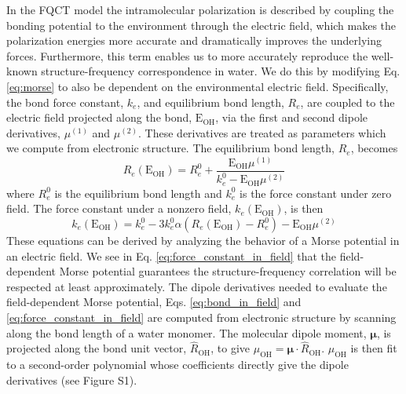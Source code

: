 \documentclass[journal=jctcce,manuscript=article]{achemso}
\begin{document}
In the FQCT model the intramolecular polarization is described by coupling the bonding potential to the environment through the electric field, which makes the polarization energies more accurate and dramatically improves the underlying forces. Furthermore, this term enables us to more accurately reproduce the well-known structure-frequency correspondence in water.\cite{boyer2019beyond} We do this by modifying Eq. \ref{eq:morse} to also be dependent on the environmental electric field.\cite{boyer2019beyond} Specifically, the bond force constant, $k_e$, and equilibrium bond length, $R_e$, are coupled to the electric field projected along the bond, $\mathrm{E_{OH}}$, via the first and second dipole derivatives, $\mu^{(1)}$ and $\mu^{(2)}$. These derivatives are treated as parameters which we compute from electronic structure. The equilibrium bond length, $R_e$, becomes
\begin{equation}
  R_e(\mathrm{E_{OH}})=R_e^0+ \frac{\mathrm{E_{OH}}\mu^{(1)}}{k_e^0-\mathrm{E_{OH}}\mu^{(2)}}
  \label{eq:bond_in_field}
\end{equation}
where $R_e^0$ is the equilibrium bond length and $k_e^0$ is the force constant under zero field. The force constant under a nonzero field, $k_e(\mathrm{E_{OH}})$, is then
\begin{equation}
  k_e(\mathrm{E_{OH}})=k_e^0-3k_e^0\alpha\left(R_e(\mathrm{E_{OH}})-R_e^0\right)-\mathrm{E_{OH}}\mu^{(2)}
  \label{eq:force_constant_in_field}
\end{equation}
These equations can be derived by analyzing the behavior of a Morse potential in an electric field.\cite{boyer2019beyond}  We see in Eq. \ref{eq:force_constant_in_field} that the field-dependent Morse potential guarantees the structure-frequency correlation will be respected at least approximately. The dipole derivatives needed to evaluate the field-dependent Morse potential, Eqs. \ref{eq:bond_in_field} and \ref{eq:force_constant_in_field} are computed from electronic structure by scanning along the  bond length of a water monomer. The molecular dipole moment, $\bm{\mu}$, is projected along the  bond unit vector, $\hat{R}_{\mathrm{OH}}$, to give $\mu_{\mathrm{OH}}=\bm{\mu}\cdot\hat{R}_{\mathrm{OH}}$. $\mu_{\mathrm{OH}}$ is then fit to a second-order polynomial whose coefficients directly give the dipole derivatives (see Figure S1).
\end{document}
